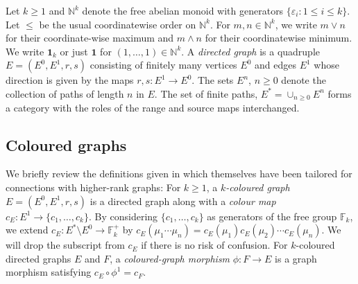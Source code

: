 \documentclass[12pt]{amsart}
\theoremstyle{definition}
\theoremstyle{remark}
\numberwithin{equation}{section}
\newcommand{\NN}{\mathbb{N}}
\begin{document}
Let $k \ge 1$ and $\NN^k$ denote the free abelian monoid with generators
$\{ \varepsilon_i : 1 \le i \le k \}$. Let $\le$ be the usual coordinatewise order on $\NN^k$. 
For $m,n\in \NN^k$, we write $m \vee n $ for their coordinate-wise maximum and $m \wedge n$ for their coordinatewise minimum.
We write $\mathbf{1}_k$ or just $\mathbf{1}$ for $(1, \ldots , 1) \in \NN^k$. A \emph{directed graph} is a quadruple $E=(E^0,E^1,r,s)$ consisting of finitely many vertices $E^0$ and edges $E^1$ whose direction is given by the maps $r,s : E^1 \to E^0$. The sets $E^n$, $n \ge 0$ denote the collection of paths of length $n$ in $E$. The set of finite paths, $E^* = \cup_{n \ge 0} E^n$ forms a category with the roles of the range and source maps interchanged.

\subsection{Coloured graphs} \label{sec:CG}
We briefly review the definitions given in \cite[\S 3]{hrsw} which themselves have been tailored for connections with higher-rank graphs: For $k \ge 1$, a \emph{$k$-coloured graph} $E=(E^0,E^1,r,s)$ is a directed graph along with a \emph{colour map} $c_E : E^1 \to \{c_1,\dots,c_k\}$. By considering $\{c_1,\dots , c_k\}$ as generators of the free group $\mathbb{F}_k$, we extend $c_E:E^* \setminus E^0 \to \mathbb{F}_k^+$ by $c_E (\mu_1 \cdots \mu_n)=c_E (\mu_1)c_E (\mu_2) \cdots c_E (\mu_n)$. We will drop the subscript from $c_E$ if there is no risk of confusion. For $k$-coloured directed graphs $E$ and $F$, a \emph{coloured-graph morphism} $\phi: F \to E$ is a graph morphism satisfying $c_E \circ \phi^1 = c_F$. 
\end{document}
